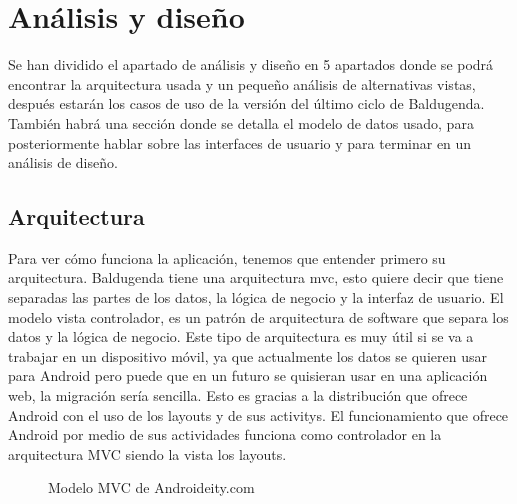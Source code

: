 \section{Análisis y diseño}
\label{secc:análisis y diseño}
Se han dividido el apartado de análisis y diseño en 5 apartados donde se podrá encontrar la arquitectura usada y un pequeño análisis de alternativas vistas, después estarán los casos de uso de la versión del último ciclo de Baldugenda. También habrá una sección donde se detalla el modelo de datos usado, para posteriormente hablar sobre las interfaces de usuario y para terminar en un análisis de diseño. 
\subsection{Arquitectura}
\label{subsecc:arquitectura}

Para ver cómo funciona la aplicación, tenemos que entender primero su arquitectura. Baldugenda tiene una arquitectura \acrshort{mvc}, esto quiere decir que tiene separadas las partes de los datos, la lógica de negocio y la interfaz de usuario.
El modelo vista controlador, es un patrón de arquitectura de software que separa los datos y la lógica de negocio. Este tipo de arquitectura es muy útil si se va a trabajar en un dispositivo móvil, ya que actualmente los datos se quieren usar para Android pero puede que en un futuro se quisieran usar en una aplicación web, la migración sería sencilla. Esto es gracias a la distribución que ofrece Android con el uso de los layouts y de sus \glspl{activity}.
El funcionamiento que ofrece Android por medio de sus actividades funciona como controlador en la arquitectura MVC siendo la vista los layouts.

\begin{figure}[H] 
  \begin{center} 
    \caption{Modelo MVC de Androideity.com} 
    \label{fig:ModeloMVC} 
  \end{center} 
\end{figure}

